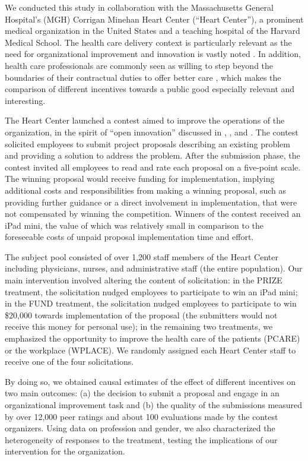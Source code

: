 \documentclass[11pt, titlepage]{article}
\begin{document}
We conducted this study in collaboration with the Massachusetts General
Hospital's (MGH) Corrigan Minehan Heart Center (``Heart Center''), a
prominent medical organization in the United States and a teaching
hospital of the Harvard Medical School. The health care delivery context
is particularly relevant as the need for organizational improvement and
innovation is vastly noted \citep[e.g.,][]{cutler2012reducing}. In
addition, health care professionals are commonly seen as willing to step
beyond the boundaries of their contractual duties to offer better care
\citep{delfgaauw2005dedicated}, which makes the comparison of different
incentives towards a public good especially relevant and interesting.

The Heart Center launched a contest aimed to improve the operations of
the organization, in the spirit of ``open innovation'' discussed in
\citet{terwiesch2008innovation}, \citet{lakhani2013prize}, and
\citet{glaeser2016predictive}. The contest solicited employees to submit
project proposals describing an existing problem and providing a
solution to address the problem. After the submission phase, the contest
invited all employees to read and rate each proposal on a five-point
scale. The winning proposal would receive funding for implementation,
implying additional costs and responsibilities from making a winning
proposal, such as providing further guidance or a direct involvement in
implementation, that were not compensated by winning the competition.
Winners of the contest received an iPad mini, the value of which was
relatively small in comparison to the foreseeable costs of unpaid
proposal implementation time and effort.

The subject pool consisted of over 1,200 staff members of the Heart
Center including physicians, nurses, and administrative staff (the
entire population). Our main intervention involved altering the content
of solicitation: in the PRIZE treatment, the solicitation nudged
employees to participate to win an iPad mini; in the FUND treatment, the
solicitation nudged employees to participate to win \$20,000 towards
implementation of the proposal (the submitters would not receive this
money for personal use); in the remaining two treatments, we emphasized
the opportunity to improve the health care of the patients (PCARE) or
the workplace (WPLACE). We randomly assigned each Heart Center staff to
receive one of the four solicitations.

By doing so, we obtained causal estimates of the effect of different
incentives on two main outcomes: (a) the decision to submit a proposal
and engage in an organizational improvement task and (b) the quality of
the submissions measured by over 12,000 peer ratings and about 100
evaluations made by the contest organizers. Using data on profession and
gender, we also characterized the heterogeneity of responses to the
treatment, testing the implications of our intervention for the
organization.
\end{document}
